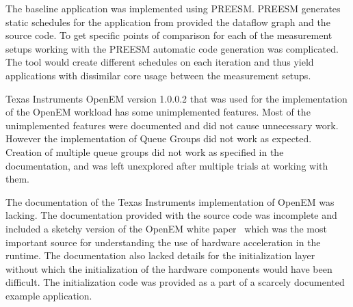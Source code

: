 The baseline application was implemented using PREESM. PREESM generates static schedules for the application from provided the dataflow graph and the source code. To get specific points of comparison for each of the measurement setups working with the PREESM automatic code generation was complicated. The tool would create different schedules on each iteration and thus yield applications with dissimilar core usage between the measurement setups.

Texas Instruments OpenEM version 1.0.0.2 that was used for the implementation of the OpenEM workload has some unimplemented features. Most of the unimplemented features were documented and did not cause unnecessary work. However the implementation of Queue Groups did not work as expected. Creation of multiple queue groups did not work as specified in the documentation, and was left unexplored after multiple trials at working with them.

The documentation of the Texas Instruments implementation of OpenEM was lacking. The documentation provided with the source code was incomplete and included a sketchy version of the OpenEM white paper~\cite{moerman2014open} which was the most important source for understanding the use of hardware acceleration in the runtime. The documentation also lacked details for the initialization layer without which the initialization of the hardware components would have been difficult. The initialization code was provided as a part of a scarcely documented example application.
